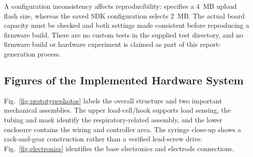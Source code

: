 A configuration inconsistency affects reproducibility:  specifies a 4~MB upload flash size, whereas the saved SDK configuration selects 2~MB. The actual board capacity must be checked and both settings made consistent before reproducing a firmware build. There are no custom tests in the supplied test directory, and no firmware build or hardware experiment is claimed as part of this report-generation process.

\subsection{Figures of the Implemented Hardware System}
Fig.~\ref{fig:prototypephotos} labels the overall structure and two important mechanical assemblies. The upper load-cell/hook supports load sensing, the tubing and mask identify the respiratory-related assembly, and the lower enclosure contains the wiring and controller area. The syringe close-up shows a rack-and-gear construction rather than a verified lead-screw drive. Fig.~\ref{fig:electronics} identifies the base electronics and electrode connections.

